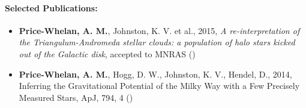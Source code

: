 \documentclass[12pt]{article}
\begin{document}
\paragraph{Selected Publications:}
\begin{itemize}\setlength{\itemsep}{0pt}

\item {\bf Price-Whelan, A. M.}, Johnston, K. V. et al., 2015,
    \emph{A re-interpretation of the Triangulum-Andromeda stellar clouds: a population of halo stars kicked out of the Galactic disk},
    accepted to MNRAS ()

\item {\bf Price-Whelan, A. M.}, Hogg, D. W., Johnston, K. V., Hendel, D., 2014,
    {Inferring the Gravitational Potential of the Milky Way with a Few Precisely Measured Stars},
    ApJ, 794, 4 ()

\end{itemize}
\end{document}
